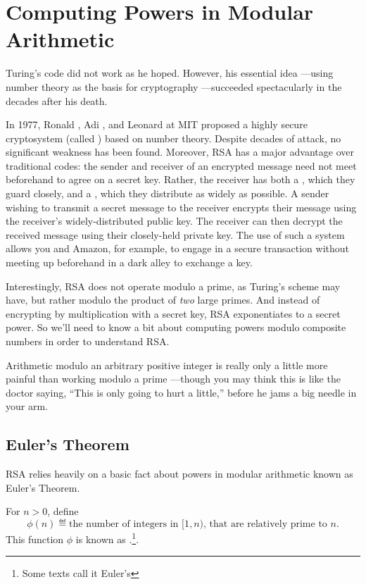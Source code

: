\section{Computing Powers in Modular Arithmetic}%
Turing's code did not work as he hoped.  However, his essential idea ---using number theory
as the basis for cryptography ---succeeded spectacularly in the decades after his death.

In 1977, Ronald , Adi , and Leonard  at MIT proposed a
highly secure cryptosystem (called \textbf{}) based on number theory.  Despite
decades of attack, no significant weakness has been found.  Moreover, RSA has a major
advantage over traditional codes: the sender and receiver of an encrypted message need not
meet beforehand to agree on a secret key.  Rather, the receiver has both a , which they guard closely, and a , which they distribute as widely
as possible.  A sender wishing to transmit a secret message to the receiver encrypts their
message using the receiver's widely-distributed public key.  The receiver can then decrypt
the received message using their closely-held private key.  The use of such a  system allows you and Amazon, for example, to engage in a secure
transaction without meeting up beforehand in a dark alley to exchange a key.

Interestingly, RSA does not operate modulo a prime, as Turing's scheme
may have, but rather modulo the product of \emph{two} large primes.
And instead of encrypting by multiplication with a secret key, RSA
exponentiates to a secret power.  So we'll need to know a bit 
about computing powers modulo composite numbers in order to understand RSA.
\begin{editingnotes}
Arithmetic modulo an arbitrary positive integer is really only a
little more painful than working modulo a prime ---though you may
think this is like the doctor saying, ``This is only going to hurt a
little,'' before he jams a big needle in your arm.
\end{editingnotes}

\subsection{Euler's Theorem}\label{Euler_sec}

RSA relies heavily on a basic fact about powers in modular arithmetic
known as Euler's Theorem.
\begin{definition}
For $n>0$, define
\[
\phi(n) \eqdef \text{the number of integers in $[1, n)$, that are relatively prime
  to~$n$.}
\]
This function $\phi$ is known as .\footnote{Some texts call it Euler's }.
\end{definition}

